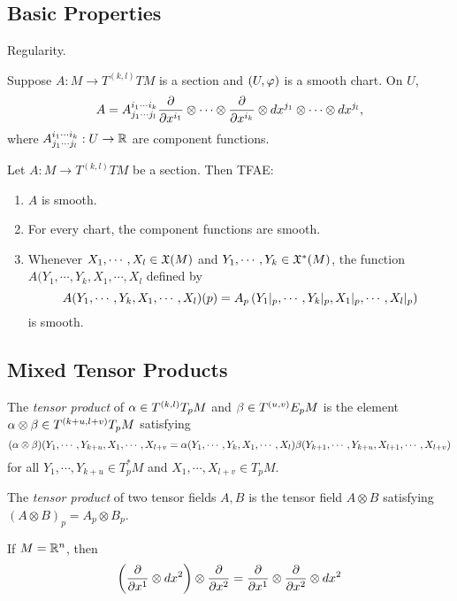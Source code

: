 \subsection{Basic Properties}
Regularity. 

Suppose $A:M \to T^{(k,l)}TM$ is a section and $(U,\varphi)$ is a smooth chart. On $U$, 
$$A = A_{j_1\cdots j_l}^{i_1 \cdots i_k}  \pdv{}{x^{i_1}} \otimes \cdots \otimes \pdv{}{x^{i_k}} \otimes dx^{j_1} \otimes \cdots \otimes dx^{j_l}, $$
where $A_{j_1 \cdots j_l}^{i_1 \cdots i_k}:U \to \mathbb{R}$ are component functions.
\begin{proposition}\label{12.19}
    Let $A:M \to T^{(k,l)}TM$ be a section. Then TFAE:
    \begin{enumerate}
    \item $A$ is smooth.
    \item For every chart, the component functions are smooth. 
    \item Whenever $X_1, \cdots, X_l \in \frak{X}(M)$ and $Y_1, \cdots, Y_k \in \frak{X}^*(M)$, the function $A(Y_1,\cdots,Y_k,X_1,\cdots,X_l$ defined by 
    $$ A(Y_1,\cdots,Y_k,X_1,\cdots,X_l)(p) = A_p\left(
    Y_1|_p, \cdots, Y_k|_p, X_1|_p, \cdots, X_l|_p
    \right)$$ is smooth. 
    \end{enumerate}
\end{proposition}

\subsection{Mixed Tensor Products}
The \textit{tensor product} of $\alpha \in T^{(k,l)}T_pM$ and $\beta \in T^{(u,v)}E_pM$ is the element $\alpha \otimes \beta \in T^{(k+u, l+v)}T_pM$ satisfying 
$$(\alpha \otimes \beta)(Y_1,\cdots,Y_{k+u}, X_1,\cdots,X_{l+v} = \alpha(Y_1,\cdots,Y_k,X_1,\cdots,X_l)\beta(Y_{k+1},\cdots,Y_{k+u},X_{l+1},\cdots,X_{l+v})$$ for all $Y_1,\cdots,Y_{k+u} \in T_p^*M$ and $X_1,\cdots,X_{l+v} \in T_pM$. 

\begin{definition}
    The \textit{tensor product} of two tensor fields $A,B$ is the tensor field $A \otimes B$ satisfying $(A \otimes B)_p = A_p \otimes B_p$. 
\end{definition}

\begin{example}
    If $M = \mathbb{R}^n$, then 
    $$\left(
    \pdv{}{x^1} \otimes dx^2 \right) \otimes \pdv{}{x^2} = 
    \pdv{}{x^1} \otimes \pdv{}{x^2} \otimes dx^2 $$
\end{example}

